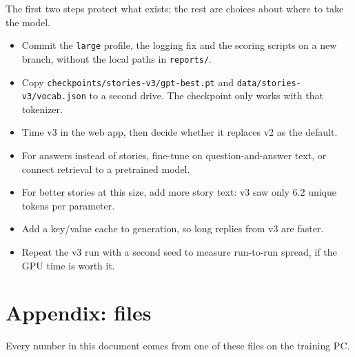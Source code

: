 \documentclass[11pt,a4paper]{article}
\newcommand{\code}[1]{\texttt{#1}}
\begin{document}
The first two steps protect what exists; the rest are choices about where to take the model.

\begin{itemize}
\item[$\square$] Commit the \code{large} profile, the logging fix and the scoring scripts on a new branch, without the local paths in \code{reports/\allowbreak{}}.
\item[$\square$] Copy \code{checkpoints/\allowbreak{}stories-\allowbreak{}v3/\allowbreak{}gpt-\allowbreak{}best.\allowbreak{}pt} and \code{data/\allowbreak{}stories-\allowbreak{}v3/\allowbreak{}vocab.\allowbreak{}json} to a second drive. The checkpoint only works with that tokenizer.
\item[$\square$] Time v3 in the web app, then decide whether it replaces v2 as the default.
\item[$\square$] For answers instead of stories, fine-tune on question-and-answer text, or connect retrieval to a pretrained model.
\item[$\square$] For better stories at this size, add more story text: v3 saw only 6.2 unique tokens per parameter.
\item[$\square$] Add a key/value cache to generation, so long replies from v3 are faster.
\item[$\square$] Repeat the v3 run with a second seed to measure run-to-run spread, if the GPU time is worth it.
\end{itemize}

\section*{Appendix: files}
{}

Every number in this document comes from one of these files on the training PC.
\end{document}
